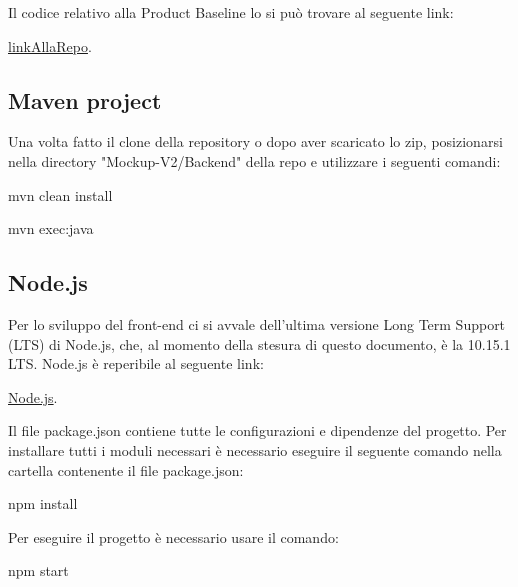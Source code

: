 Il codice relativo alla Product Baseline lo si può trovare al seguente link:
\begin{center}
\href{https://github.com/SWEightgroup/Development}{linkAllaRepo}. 
\end{center}

\subsection{Maven project}
Una volta fatto il clone della repository o dopo aver scaricato lo zip, posizionarsi nella directory "Mockup-V2/Backend" della repo e utilizzare i seguenti comandi:

\begin{center}
\textsf{mvn clean install}
\end{center}

\begin{center}
\textsf{mvn exec:java}
\end{center}

\subsection{Node.js}
Per lo sviluppo del front-end ci si avvale dell’ultima versione Long Term Support (LTS) di Node.js, che, al momento della stesura di questo documento, è la 10.15.1 LTS. Node.js è reperibile al
seguente link:

\begin{center}
\href{https://nodejs.org/it/}{Node.js}. 
\end{center}

Il file package.json contiene tutte le configurazioni e dipendenze del progetto. Per installare tutti i moduli
necessari è necessario eseguire il seguente comando nella cartella contenente il file package.json:
\begin{center}
\textsf{npm install}
\end{center}
Per eseguire il progetto è necessario usare il comando:
\begin{center}
\textsf{npm start}
\end{center}
